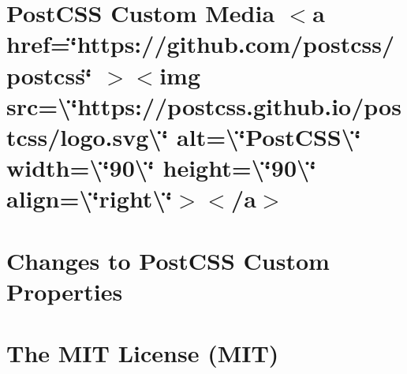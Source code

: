 \documentclass[twoside]{book}
\newcommand{\+}{\discretionary{\mbox{\scriptsize$\hookleftarrow$}}{}{}}
\begin{document}
\chapter{Post\+CSS Custom Media \texorpdfstring{$<$}{<}a href=\char`\"{}https\+://github.\+com/postcss/postcss\char`\"{} \texorpdfstring{$>$}{>}\texorpdfstring{$<$}{<}img src=\textbackslash{}\char`\"{}https\+://postcss.\+github.\+io/postcss/logo.\+svg\textbackslash{}\char`\"{} alt=\textbackslash{}\char`\"{}\+Post\+CSS\textbackslash{}\char`\"{} width=\textbackslash{}\char`\"{}90\textbackslash{}\char`\"{} height=\textbackslash{}\char`\"{}90\textbackslash{}\char`\"{} align=\textbackslash{}\char`\"{}right\textbackslash{}\char`\"{}\texorpdfstring{$>$}{>}\texorpdfstring{$<$}{<}/a\texorpdfstring{$>$}{>}}
\label{md__c___users_vaishnavi_jadhav__desktop__developer_code_mean_stack_example_client_node_modules_pe8857f0678ca902b1d38061ce9e9e3ec}

\chapter{Changes to Post\+CSS Custom Properties}
\label{md__c___users_vaishnavi_jadhav__desktop__developer_code_mean_stack_example_client_node_modules_p0d8a5829680ecd94a0838c3f8aceca79}

\chapter{The MIT License (MIT)}
\label{md__c___users_vaishnavi_jadhav__desktop__developer_code_mean_stack_example_client_node_modules_p18a36813cad49e4476721857dd8b0b68}

\end{document}
